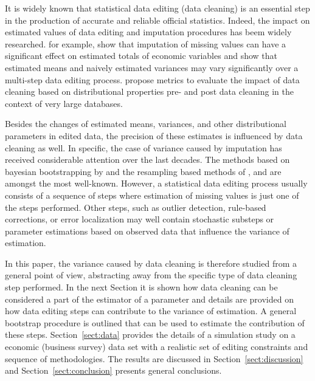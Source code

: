 
It is widely known that statistical data editing (data cleaning) is an
essential step in the production of accurate and reliable official statistics.
Indeed, the impact on estimated values of data editing and imputation
procedures has beem widely researched. \citet{whitridge2006impact} for example,
show that imputation of missing values can have a significant effect on
estimated totals of economic variables and \cite{loo2014towards} show that
estimated means and naively estimated variances may vary significantly over a
multi-step data editing process. \cite{dasu2012statistical} propose metrics to
evaluate the impact of data cleaning based on distributional properties pre-
and post data cleaning in the context of very large databases.

Besides the changes of estimated means, variances, and other distributional
parameters in edited data, the precision of these estimates is influenced by
data cleaning as well. In specific, the case of variance caused by imputation
has received considerable attention over the last decades. The methods based on
bayesian bootstrapping by \cite{rubin1987multiple,rubin1996multiple} and the
resampling based methods of \cite{rao1992jackknife,rao1996variance}, and
\citet{shao1996bootstrap}  \cite{shao2002sample,shao2008confidence} are amongst
the most well-known. However, a statistical data editing process usually
consists of a sequence of steps where estimation of missing values is just one
of the steps performed.  Other steps, such as outlier detection, rule-based
corrections, or error localization may well contain stochastic substeps or
parameter estimations based on observed data that influence the variance of
estimation.

In this paper, the variance caused by data cleaning is therefore studied from a
general point of view, abstracting away from the specific type of data cleaning
step performed. In the next Section it is shown how data cleaning can be
considered a part of the estimator of a parameter and details are provided on
how data editing steps can contribute to the variance of estimation. A general
bootstrap procedure is outlined that can be used to estimate the contribution
of these steps.  Section~\ref{sect:data} provides the details of a simulation
study on a economic (business survey) data set with a realistic set of editing
constraints and sequence of methodologies. The results are discussed in
Section~\ref{sect:discussion} and Section~\ref{sect:conclusion} presents
general conclusions.












